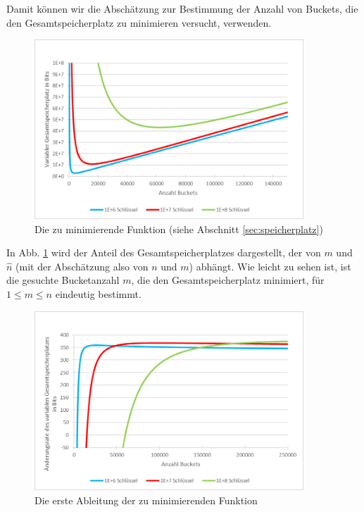 \documentclass[a4paper,12pt,twoside]{report}
\begin{document}
Damit können wir die Abschätzung zur Bestimmung der Anzahl von Buckets, die den Gesamtspeicherplatz zu minimieren versucht, verwenden.

\begin{figure}[tbhp]
\centering
\includegraphics[width=0.9\textwidth]{diagrams/MinSizeZielfunktion.png}
\caption{Die zu minimierende Funktion (siehe Abschnitt \ref{sec:speicherplatz})}
\label{img:minSizeZielfunktion}
\end{figure}

In Abb. \ref{img:minSizeZielfunktion} wird der Anteil des Gesamtspeicherplatzes dargestellt, der von $m$ und $\hat{n}$ (mit der Abschätzung also von $n$ und $m$) abhängt.
Wie leicht zu sehen ist, ist die gesuchte Bucketanzahl $m$, die den Gesamtspeicherplatz minimiert, für $1\leq m\leq n$ eindeutig bestimmt.

\begin{figure}[tbhp]
\centering
\includegraphics[width=0.9\textwidth]{diagrams/MinSizeZielfunktionAbleitung.png}
\caption{Die erste Ableitung der zu minimierenden Funktion}
\label{img:minSizeZielfunktionAbleitung}
\end{figure}
\end{document}
